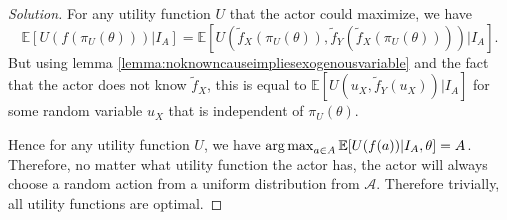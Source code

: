  \begin{proof}[Solution]
 	For any utility function $U$ that the actor could maximize, we have \[\mathbb E[U(f(\pi_U(\theta)))|I_A]=\mathbb E[U(\tilde f_X(\pi_U(\theta)),\tilde f_Y(\tilde f_X(\pi_U(\theta))))|I_A].\] But using lemma \ref{lemma:noknowncauseimpliesexogenousvariable} and the fact that the actor does not know $\tilde f_X$, this is equal to $\mathbb E[U(u_X,\tilde f_Y(u_X))|I_A]$ for some random variable $u_X$ that is independent of $\pi_U(\theta)$. 
 	
 	Hence for any utility function $U$, we have $\operatorname*{arg\,max}_{a\in  A}\mathbb E[U(f(a))|I_A,\theta]= A$. Therefore, no matter what utility function the actor has, the actor will always choose a random action from a uniform distribution from $\mathcal A$. Therefore trivially, all utility functions are optimal.
 \end{proof}
 

 
 
 
 
 
 
 
 
 
 
 
 
 
 
 
 
 
 
 
 
 
 

